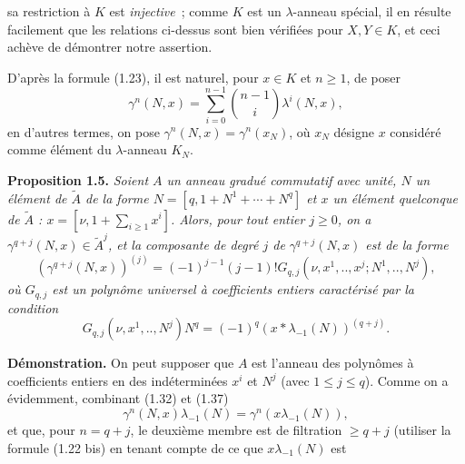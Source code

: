 sa
restriction à $K$ est \emph{injective}~; comme $K$ est un $\lambda$-anneau spécial, il en résulte facilement que les relations ci-dessus sont bien vérifiées pour $X,Y\in K$, et ceci achève de démontrer notre assertion.

D'après la formule (1.23), il est naturel, pour $x\in K$ et $n\geq1$, de poser
\begin{equation}\tag{1.37}
\gamma^n(N,x)=\sum_{i=0}^{n-1}\binom{n-1}{i}\lambda^i(N,x),
\end{equation}
en d'autres termes, on pose $\gamma^n(N,x)=\gamma^n(x_N)$, où $x_N$ désigne $x$ considéré comme élément du $\lambda$-anneau $K_N$.

\textbf{Proposition 1.5.} \emph{Soient $A$ un anneau gradué commutatif avec unité, $N$ un élément de $\widetilde A$ de la forme $N=[q,1+N^1+\cdots+N^q]$ et $x$ un élément quelconque de $\widetilde A$ : $x=[\nu,1+\sum_{i\geq1}x^i]$. Alors, pour tout entier $j\geq0$, on a $\gamma^{q+j}(N,x)\in\widetilde A^j$, et la composante de degré $j$ de $\gamma^{q+j}(N,x)$ est de la forme}
\begin{equation}\tag{1.38}
\left(\gamma^{q+j}(N,x)\right)^{(j)}=(-1)^{j-1}(j-1)!G_{q,j}(\nu,x^1,..,x^j;N^1,..,N^j),
\end{equation}
\emph{où $G_{q,j}$ est un polynôme universel à coefficients entiers caractérisé par la condition}
\begin{equation}\tag{1.39}
G_{q,j}(\nu,x^1,..,N^j)N^q=(-1)^q(x*\lambda_{-1}(N))^{(q+j)}.
\end{equation}

\textbf{Démonstration.} On peut supposer que $A$ est l'anneau des polynômes à coefficients entiers en des indéterminées $x^i$ et $N^j$ (avec $1\leq j\leq q$). Comme on a évidemment, combinant (1.32) et (1.37)
\begin{equation}\tag{1.40}
\gamma^n(N,x)\lambda_{-1}(N)=\gamma^n(x\lambda_{-1}(N)),
\end{equation}
et que, pour $n=q+j$, le deuxième membre est de filtration $\geq q+j$ (utiliser la formule (1.22 bis) en tenant compte de ce que $x\lambda_{-1}(N)$ est
